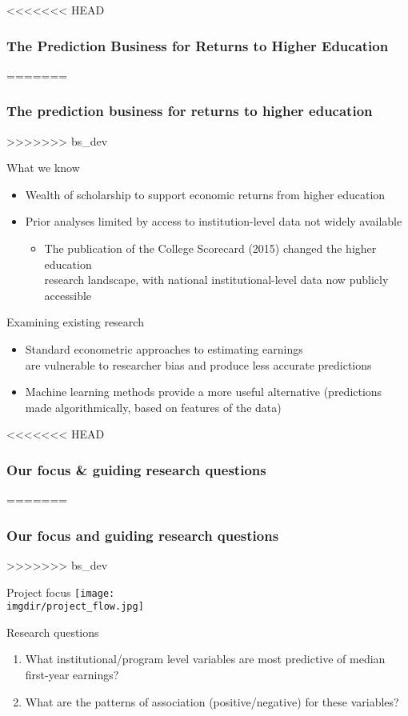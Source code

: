 \documentclass[aspectratio=169, t, 10pt]{beamer}
\begin{document}
\begin{frame}
<<<<<<< HEAD
  \frametitle{The Prediction Business for Returns to Higher Education}
=======
  \frametitle{The prediction business for returns to higher education}
>>>>>>> bs_dev
  \begin{block}{What we know}
    \begin{itemize}
    	\item Wealth of scholarship to support economic returns from
          higher education
          \citep{card:1995, Card:1999, Card:2001, doyle2016educearn, Oreopoulous_Petronijevic_2013}
    	\item Prior analyses limited by access to institution-level data not widely available 
   	 \begin{itemize}
    		\item The publication of the College Scorecard (2015) changed the higher education \\
		research landscape, with national institutional-level
                data now publicly accessible
                \citep{obama_2013}
   	 \end{itemize}
    \end{itemize}
  \end{block}
  \begin{block}{Examining existing research}
    \begin{itemize}
    \item Standard econometric approaches to estimating earnings \\
    are vulnerable to researcher bias and produce less accurate predictions
    \item Machine learning methods provide a more useful alternative (predictions \\
    made algorithmically, based on features of the data)
    \end{itemize}
  \end{block}
\end{frame}

\begin{frame}
<<<<<<< HEAD
  \frametitle{Our focus \& guiding research questions}
=======
  \frametitle{Our focus and guiding research questions}
>>>>>>> bs_dev
  \begin{block}{Project focus}
    \centering
    \texttt{[image: \\imgdir/project\_flow.jpg]}
  \end{block}
  \begin{block}{Research questions}
    \begin{enumerate}
        \item What institutional\slash program level variables are most
          predictive of median first-year earnings?
        \item What are the patterns of association (positive\slash negative)
          for these variables?
    \end{enumerate}
   \end{block}
\end{frame}
\end{document}
